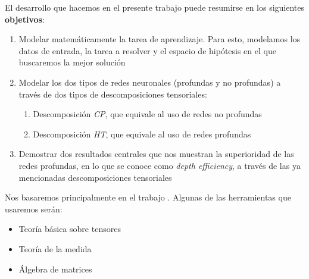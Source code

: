 El desarrollo que hacemos en el presente trabajo puede resumirse en los siguientes \textbf{objetivos}:

\begin{enumerate}
    \item Modelar matemáticamente la tarea de aprendizaje. Para esto, modelamos los datos de entrada, la tarea a resolver y el espacio de hipótesis en el que buscaremos la mejor solución
    \item Modelar los dos tipos de redes neuronales (profundas y no profundas) a través de dos tipos de descomposiciones tensoriales:
        \begin{enumerate}
            \item Descomposición \textit{CP}, que equivale al uso de redes no profundas
            \item Descomposición \textit{HT}, que equivale al uso de redes profundas
        \end{enumerate}
    \item Demostrar dos resultados centrales que nos muestran la superioridad de las redes profundas, en lo que se conoce como \textit{depth efficiency}, a través de las ya mencionadas descomposiciones tensoriales
\end{enumerate}

Nos basaremos principalmente en el trabajo \cite{matematicas:principal}. Algunas de las herramientas que usaremos serán:

\begin{itemize}
    \item Teoría básica sobre tensores
    \item Teoría de la medida
    \item Álgebra de matrices
\end{itemize}

\endinput
